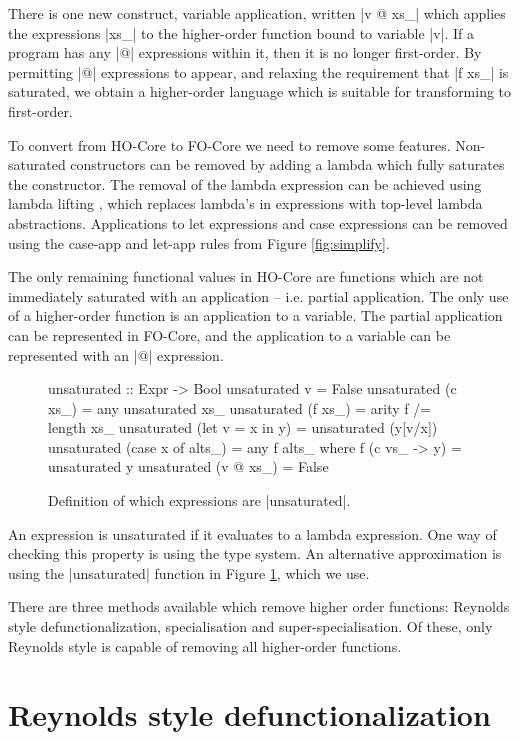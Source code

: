 There is one new construct, variable application, written |v @ xs_| which applies the expressions |xs_| to the higher-order function bound to variable |v|. If a program has any |@| expressions within it, then it is no longer first-order. By permitting |@| expressions to appear, and relaxing the requirement that |f xs_| is saturated, we obtain a higher-order language which is suitable for transforming to first-order.

To convert from HO-Core to FO-Core we need to remove some features. Non-saturated constructors can be removed by adding a lambda which fully saturates the constructor. The removal of the lambda expression can be achieved using lambda lifting \cite{lambda_lift}, which replaces lambda's in expressions with top-level lambda abstractions. Applications to let expressions and case expressions can be removed using the case-app and let-app rules from Figure \ref{fig:simplify}.

The only remaining functional values in HO-Core are functions which are not immediately saturated with an application -- i.e. partial application. The only use of a higher-order function is an application to a variable. The partial application can be represented in FO-Core, and the application to a variable can be represented with an |@| expression.

\begin{figure}
\begin{code}
unsaturated :: Expr -> Bool
unsaturated v = False
unsaturated (c xs_) = any unsaturated xs_
unsaturated (f xs_) = arity f /= length xs_
unsaturated (let v = x in y) = unsaturated (y[v/x])
unsaturated (case x of alts_) = any f alts_
    where f (c vs_ -> y) = unsaturated y
unsaturated (v @ xs_) = False
\end{code}
\caption{Definition of which expressions are |unsaturated|.}
\label{fig:unsaturated}
\end{figure}

An expression is unsaturated if it evaluates to a lambda expression. One way of checking this property is using the type system. An alternative approximation is using the |unsaturated| function in Figure \ref{fig:unsaturated}, which we use.

There are three methods available which remove higher order functions: Reynolds style defunctionalization, specialisation and super-specialisation. Of these, only Reynolds style is capable of removing all higher-order functions.

\section{Reynolds style defunctionalization}

